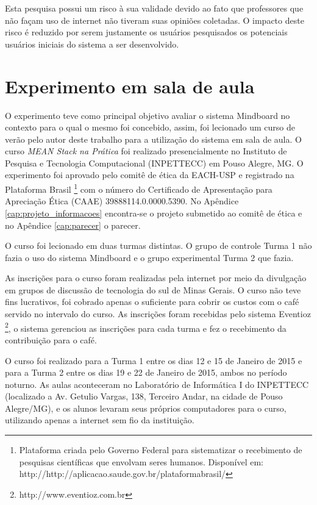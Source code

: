 Esta pesquisa possui um risco à sua validade devido ao fato que professores que não façam uso de internet não tiveram suas opiniões coletadas. O impacto deste risco é reduzido por serem justamente os usuários pesquisados os potenciais usuários iniciais do sistema a ser desenvolvido.



\section{Experimento em sala de aula}
\label{sec:metodologia_experimento}

O experimento teve como principal objetivo avaliar o sistema Mindboard no contexto para o qual o mesmo foi concebido, assim, foi lecionado um curso de verão pelo autor deste trabalho para a utilização do sistema em sala de aula. O curso \emph{MEAN Stack na Prática} foi realizado presencialmente no Instituto de Pesquisa e Tecnologia Computacional (INPETTECC) em Pouso Alegre, MG. O experimento foi aprovado pelo comitê de ética da EACH-USP e registrado na Plataforma Brasil \footnote{Plataforma criada pelo Governo Federal para sistematizar o recebimento de pesquisas científicas que envolvam seres humanos. Disponível em: http://http://aplicacao.saude.gov.br/plataformabrasil/} com o número do Certificado de Apresentação para Apreciação Ética (CAAE) 39888114.0.0000.5390. No Apêndice \ref{cap:projeto_informacoes} encontra-se o projeto submetido ao comitê de ética e no Apêndice \ref{cap:parecer} o parecer.

O curso foi lecionado em duas turmas distintas. O grupo de controle Turma 1 não fazia o uso do sistema Mindboard e o grupo experimental Turma 2 que fazia.

As inscrições para o curso foram realizadas pela internet por meio da divulgação em grupos de discussão de tecnologia do sul de Minas Gerais. O curso não teve fins lucrativos, foi cobrado apenas o suficiente para cobrir os custos com o café servido no intervalo do curso. As inscrições foram recebidas pelo sistema Eventioz \footnote{http://www.eventioz.com.br}, o sistema gerenciou as inscrições para cada turma e fez o recebimento da contribuição para o café.

O curso foi realizado para a Turma 1 entre os dias 12 e 15 de Janeiro de 2015 e para a Turma 2 entre os dias 19 e 22 de Janeiro de 2015, ambos no período noturno.  As aulas aconteceram no Laboratório de Informática I do INPETTECC (localizado a Av. Getulio Vargas, 138, Terceiro Andar, na cidade de Pouso Alegre/MG), e os alunos levaram seus próprios computadores para o curso, utilizando apenas a internet sem fio da instituição.

